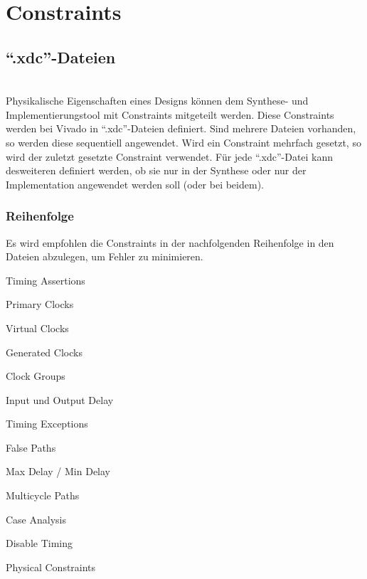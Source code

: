 \section{Constraints}
\subsection{``.xdc''-Dateien}$~$ \\
Physikalische Eigenschaften eines Designs können dem Synthese- und Implementierungstool mit Constraints mitgeteilt werden. Diese Constraints werden bei Vivado in ``.xdc''-Dateien definiert. Sind mehrere Dateien vorhanden, so werden diese sequentiell angewendet. Wird ein Constraint mehrfach gesetzt, so wird der zuletzt gesetzte Constraint verwendet. Für jede ``.xdc''-Datei kann desweiteren definiert werden, ob sie nur in der Synthese oder nur der Implementation angewendet werden soll (oder bei beidem).


\subsubsection{Reihenfolge}
Es wird empfohlen die Constraints in der nachfolgenden Reihenfolge in den Dateien abzulegen, um Fehler zu minimieren.
\begin{multicols}{3}
    \begin{compactenum}
        \item Timing Assertions
        \begin{compactenum}
            \item Primary Clocks
            \item Virtual Clocks
            \item Generated Clocks
            \item Clock Groups
            \item Input und Output Delay
        \end{compactenum}
        \item Timing Exceptions
        \begin{compactenum}
            \item False Paths
            \item Max Delay / Min Delay
            \item Multicycle Paths
            \item Case Analysis
            \item Disable Timing
        \end{compactenum}
        \item Physical Constraints \\ \ \\ \ \\ \ \\
    \end{compactenum}
\end{multicols}

